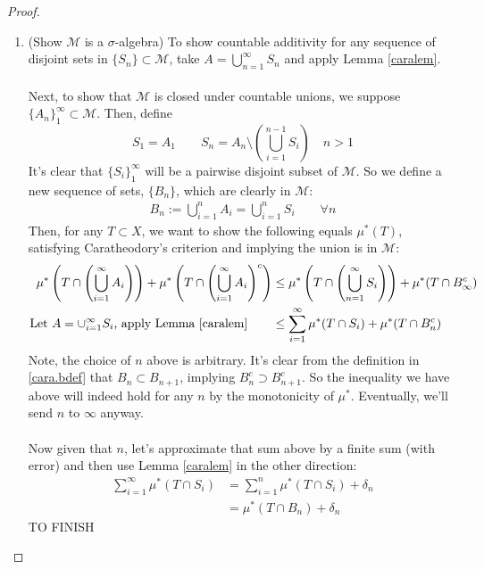 \documentclass[12pt]{article}
\theoremstyle{plain}
\theoremstyle{definition}
\theoremstyle{remark}
\begin{document}
\begin{proof}
\begin{enumerate}
\item 
(Show $\mathscr{M}$ is a $\sigma$-algebra) To show countable additivity for any sequence of disjoint sets in $\{S_n\}\subset\mathscr{M}$, take $A=\bigcup^\infty_{n=1} S_n$ and apply Lemma \ref{caralem}.
\\
\\
Next, to show that $\mathscr{M}$ is closed under countable unions, we suppose $\{A_n\}_1^\infty \subset \mathscr{M}$.  Then, define 
\[
    S_1 = A_1 \qquad 
    S_n = A_n \setminus 
    \left(\bigcup^{n-1}_{i=1} S_{i}\right)
    \quad \text{$n>1$}
\]
It's clear that $\{S_i\}_{1}^\infty$ will be a pairwise disjoint subset of $\mathscr{M}$. So we define a new sequence of sets, $\{B_n\}$, which are clearly in $\mathscr{M}$:
\begin{align}
    \label{cara.bdef}
    B_n := \bigcup^n_{i=1} A_i = \bigcup^n_{i=1} S_i
    \qquad \forall n
\end{align}
Then, for any $T\subset X$, we want to show the following equals $\mu^*(T)$, satisfying Caratheodory's criterion and implying the union is in $\mathscr{M}$:
\begin{align*}
    \mu^*\left(T \cap \left(\bigcup^\infty_{i=1} A_i
    \right)\right) + 
    \mu^*\left(T \cap \left(\bigcup^\infty_{i=1} A_i
    \right)^c\right) 
    &\leq 
    \mu^*\left(T \cap \left(\bigcup^\infty_{n=1} S_i
    \right)\right) + 
    \mu^*(T \cap B_\infty^c) \\
    \text{Let $A=\cup^\infty_{i=1} S_i$, apply Lemma \ref{caralem}} \qquad 
    &\leq 
    \sum^\infty_{i=1}\mu^*(T\cap S_i) + 
    \mu^*(T \cap B_n^c) 
\end{align*}
Note, the choice of $n$ above is arbitrary. It's clear from the definition in \ref{cara.bdef} that $B_n\subset B_{n+1}$, implying $B_n^c \supset B_{n+1}^c$. So the inequality we have above will indeed hold for any $n$ by the monotonicity of $\mu^*$. Eventually, we'll send $n$ to $\infty$ anyway.
\\
\\
Now given that $n$, let's approximate that sum above by a finite sum (with error) and then use Lemma \ref{caralem} in the other direction:
\begin{align*}
    \sum^\infty_{i=1}\mu^*(T\cap S_i) &= 
    \sum^n_{i=1}\mu^*(T\cap S_i) + \delta_n \\
    &= \mu^*(T\cap B_n) + \delta_n 
\end{align*}
TO FINISH



\end{enumerate}

\end{proof}
\end{document}
